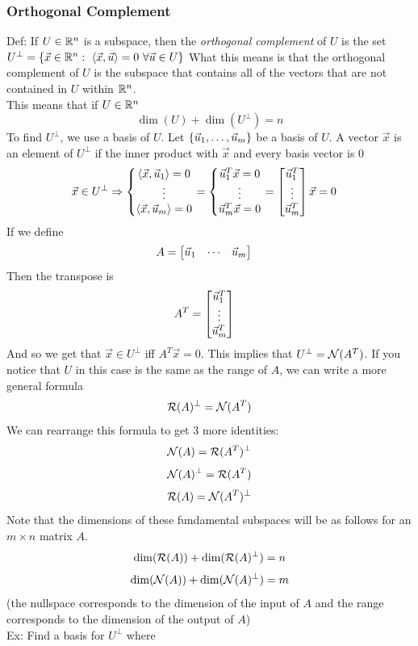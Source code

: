 \documentclass[11pt, fleqn]{article}
\begin{document}
\subsubsection{Orthogonal Complement}
Def: If $U\in\mathbb{R}^n$ is a subspace, then the \textit{orthogonal complement} of $U$ is the set $U^\perp=\brcurly{\vec{x}\in\R^n:\ \brangle{\vec{x},\vec{u}}=0\ \forall\vec{u}\in U}$
What this means is that the orthogonal complement of $U$ is the subspace that contains all of the vectors that are not contained in $U$ within $\mathbb{R}^n$.\\
This means that if $U\in\mathbb{R}^n$
$$\dim(U)+\dim(U^\perp)=n$$
To find $U^\perp$, we use a basis of $U$. Let $\left\{ \vec{u}_1,\ldots,\vec{u}_m \right\}$ be a basis of $U$. A vector $\vec{x}$ is an element of $U^\perp$ if the inner product with $\vec{x}$ and every basis vector is 0
\begin{align*}
    &\vec{x}\in U^\perp\Ra \eqnsystem{\brangle{\vec{x},\vec{u}_1}=0\\ \vdots\\ \brangle{\vec{x},\vec{u}_m}=0}=\eqnsystem{\vec{u}_1^T\vec{x}=0\\ \vdots\\ \vec{u}_m^T\vec{x}=0}=\matrixx{\vec{u}_1^T\\ \vdots\\ \vec{u}_m^T}\vec{x}=0
\end{align*}
If we define
\begin{align*}
    &A=\matrixx{\vec{u}_1 & \cdots & \vec{u}_m}
\end{align*}
Then the transpose is
\begin{align*}
    &A^T=\matrixx{\vec{u}_1^T\\ \vdots\\ \vec{u}_m^T}
\end{align*}
And so we get that $\vec{x}\in U^\perp$ iff $A^T\vec{x}=0$. This implies that $U^\perp=\mathcal{N}(A^T)$. If you notice that $U$ in this case is the same as the range of $A$, we can write a more general formula
$$\mathcal{R}(A)^\perp=\mathcal{N}(A^T)$$
We can rearrange this formula to get 3 more identities:
$$\mathcal{N}(A)=\mathcal{R}(A^T)^\perp$$
$$\mathcal{N}(A)^\perp=\mathcal{R}(A^T)$$
$$\mathcal{R}(A)=\mathcal{N}(A^T)^\perp$$
Note that the dimensions of these fundamental subspaces will be as follows for an $m\times n$ matrix $A$.
$$\dim(\mathcal{R}(A))+\dim(\mathcal{R}(A)^\perp)=n$$
$$\dim(\mathcal{N}(A))+\dim(\mathcal{N}(A)^\perp)=m$$
(the nullspace corresponds to the dimension of the input of $A$ and the range corresponds to the dimension of the output of $A$)\\
Ex: Find a basis for $U^\perp$ where
\end{document}
